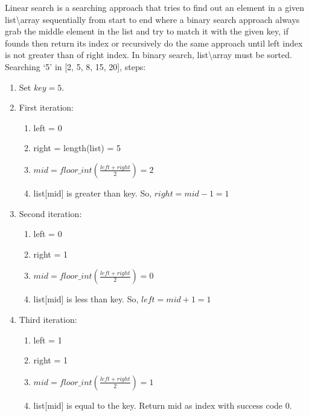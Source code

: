 \justify
{
Linear search is a searching approach that tries to find out an element in a given list\textbackslash array sequentially from start to end where a binary search approach always grab the middle element in the list and try to match it with the given key, if founds then return its index or recursively do the same approach until left index is not greater than of right index. In binary search, list\textbackslash array must be sorted.\\
}
Searching \enquote*{5} in [2, 5, 8, 15, 20], steps:
\begin{enumerate}
	\item Set $key = 5$.
	\item First iteration:
		\begin{enumerate}
			\item left = 0
			\item right = length(list) = 5
			\item $mid = floor\_int\left(\frac{left+right}{2}\right) = 2$
			\item list[mid] is greater than key. So, $right = mid -1 = 1$
		\end{enumerate}
	\item Second iteration:
		\begin{enumerate}
			\item left = 0
			\item right = 1
			\item $mid = floor\_int\left(\frac{left+right}{2}\right) = 0$
			\item list[mid] is less than key. So, $left = mid+1 = 1$
		\end{enumerate}
	\item Third iteration:
		\begin{enumerate}
			\item left = 1
			\item right = 1
			\item $mid = floor\_int\left(\frac{left+right}{2}\right) = 1$
			\item list[mid] is equal to the key. Return mid as index with success code 0.
		\end{enumerate}
\end{enumerate}